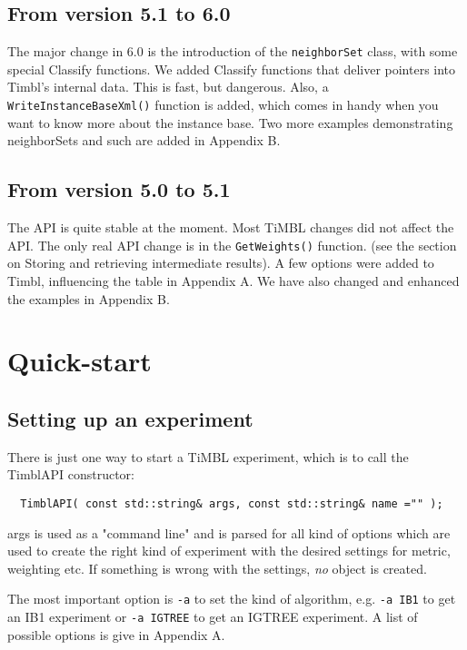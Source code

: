 \documentclass{report}
\begin{document}
\section{From version 5.1 to 6.0}

The major change in 6.0 is the introduction of the {\tt neighborSet}
class, with some special Classify functions.  We added Classify
functions that deliver pointers into Timbl's internal data. This is
fast, but dangerous.  Also, a {\tt WriteInstanceBaseXml()} function is
added, which comes in handy when you want to know more about the
instance base.  Two more examples demonstrating neighborSets and such
are added in Appendix B.

\section{From version 5.0 to 5.1}

The API is quite stable at the moment. Most TiMBL changes did not
affect the API. The only real API change is in the {\tt GetWeights()}
function. (see the section on Storing and retrieving intermediate
results).  A few options were added to Timbl, influencing the table in
Appendix A. We have also changed and enhanced the examples in Appendix
B.

\chapter{Quick-start}
\section{Setting up an experiment}

There is just one way to start a TiMBL experiment, which is to call the TimblAPI constructor:

\begin{footnotesize}
\begin{verbatim}
  TimblAPI( const std::string& args, const std::string& name ="" );
\end{verbatim}
\end{footnotesize}

args is used as a "command line" and is parsed for all kind of options
which are used to create the right kind of experiment with the desired
settings for metric, weighting etc. If something is wrong with the
settings, {\em no}\/ object is created.

The most important option is {\tt -a}  to set the kind of algorithm,
e.g. {\tt -a IB1} to get an IB1 experiment or {\tt -a IGTREE} to get an IGTREE
experiment. A list of possible options is give in Appendix A.
\end{document}
